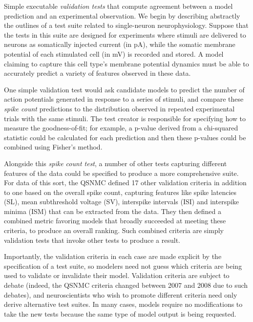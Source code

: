 \documentclass[11pt,letterpaper]{article}
\begin{document}
Simple executable \emph{validation tests} that compute agreement between a model prediction and an experimental observation.  We begin by describing abstractly the outlines of a test suite related to single-neuron neurophysiology. 
Suppose that the tests in this suite are designed for experiments where stimuli are delivered to neurons as somatically injected current (in pA), while the somatic membrane potential of each stimulated cell (in mV) is recorded and stored.  
A model claiming to capture this cell type's membrane potential dynamics must be able to accurately predict a variety of features observed in these data.

One simple validation test would ask candidate models to predict the number of action potentials generated in response to a series of stimuli, and compare these \emph{spike count} predictions to the distribution observed in repeated experimental trials with the same stimuli. 
The test creator is responsible for specifying how to measure the goodness-of-fit; 
for example, a p-value derived from a chi-squared statistic could be calculated for each prediction and then these p-values could be combined using Fisher's method\cite{fisher_statistical_1925}.

Alongside this \emph{spike count test}, a number of other tests capturing different features of the data could be specified to produce a more comprehensive suite. 
For data of this sort, the QSNMC defined 17 other validation criteria in addition to one based on the overall spike count, capturing features like spike latencies (SL), mean subthreshold voltage (SV), interspike intervals (ISI) and interspike minima (ISM) that can be extracted from the data\cite{jolivet_quantitative_2008}. 
They then defined a combined metric favoring models that broadly succeeded at meeting these criteria, to produce an overall ranking. 
Such combined criteria are simply validation tests that invoke other tests to produce a result.

Importantly, the validation criteria in each case are made explicit by the specification of a test suite, so modelers need not guess which criteria are being used to validate or invalidate their model. 
Validation criteria are subject to debate (indeed, the QSNMC criteria changed between 2007 and 2008 due to such debates), and neuroscientists who wish to promote different criteria need only derive alternative test suites. 
In many cases, models require no modifications to take the new tests because the same type of model output is being requested.
\end{document}
